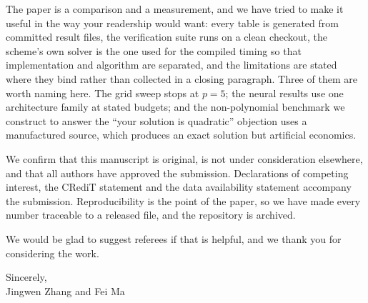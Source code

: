 \documentclass[11pt]{article}
\begin{document}
\noindent The paper is a comparison and a measurement, and we have tried to make it useful in the way
your readership would want: every table is generated from committed result files, the verification
suite runs on a clean checkout, the scheme's own solver is the one used for the compiled timing so
that implementation and algorithm are separated, and the limitations are stated where they bind
rather than collected in a closing paragraph. Three of them are worth naming here. The grid sweep
stops at $p=5$; the neural results use one architecture family at stated budgets; and the
non-polynomial benchmark we construct to answer the ``your solution is quadratic'' objection uses a
manufactured source, which produces an exact solution but artificial economics.

\noindent We confirm that this manuscript is original, is not under consideration elsewhere, and that
all authors have approved the submission. Declarations of competing interest, the CRediT statement
and the data availability statement accompany the submission. Reproducibility is the point of the
paper, so we have made every number traceable to a released file, and the repository is archived.

\vspace{1em}
\noindent We would be glad to suggest referees if that is helpful, and we thank you for considering
the work.

\vspace{1.4em}
\noindent Sincerely,\\
Jingwen Zhang and Fei Ma
\end{document}
